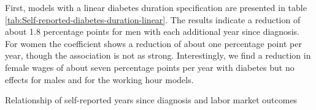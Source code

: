 \documentclass[12pt,english,british]{article}
\begin{document}
First, models with a linear diabetes duration specification are presented
in table \ref{tab:Self-reported-diabetes-duration-linear}. The results
indicate a reduction of about 1.8 percentage points for men with each
additional year since diagnosis. For women the coefficient shows a
reduction of about one percentage point per year, though the association
is not as strong. Interestingly, we find a reduction in female wages of about seven percentage points per year with diabetes but no effects for males and for the working hour models.
\begin{table}[h]
\caption{\label{tab:Self-reported-diabetes-duration-linear}Relationship of self-reported years since diagnosis and labor market outcomes}
\begin{center}
\begin{adjustbox}{max width=\textwidth}


\end{adjustbox}
\end{center}
\end{table}
\end{document}
